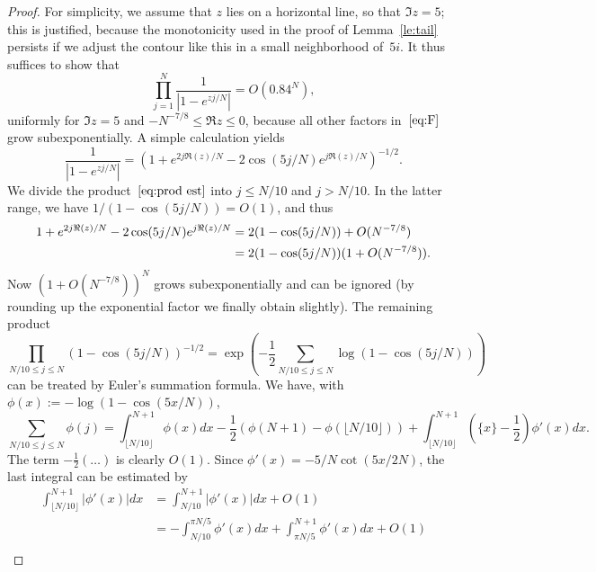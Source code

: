 \documentclass[a4paper]{amsart}
\begin{document}
\begin{proof}
For simplicity, we assume that $z$ lies on a horizontal line,
so that $\Im z=5$; this is justified, because the monotonicity
used in the proof of Lemma~\ref{le:tail} persists if we adjust the contour like
this in a small neighborhood of~$5i$.
  It thus suffices to show that
  \begin{equation}\label{eq:prod est}
      \prod_{j=1}^N \frac{1}{|1-e^{z j/N}|} = O(0.84^N),
   \end{equation}
  uniformly for $\Im z=5$ and $-N^{-7/8} \leq \Re z \leq 0$,
  because all other factors in~$\eqref{eq:F}$ grow subexponentially.
  A simple calculation yields
  \begin{equation}\label{eq:abs expl}
    \frac{1}{|1-e^{z j/N}|} = \left(1+  e^{2j \Re(z)/N} - 2\cos(5j/N)
    e^{j \Re(z)/N} \right)^{-1/2}.
  \end{equation}
  We divide the product~$\eqref{eq:prod est}$
  into $j\leq N/10$ and $j>N/10$. In the latter range,
  we have $1/(1-\cos(5j/N))=O(1)$, and thus
  \begin{align}
    1+  e^{2j \Re(z)/N} - 2\cos(5j/N) e^{j \Re(z)/N}
      &= 2(1-\cos(5j/N))+ O(N^{-7/8}) \notag \\
    &= 2(1-\cos(5j/N))(1+ O(N^{-7/8})). \label{eq:j big}
  \end{align}
  Now $(1+ O(N^{-7/8}))^N$ grows subexponentially and can be ignored (by rounding
  up the exponential factor we finally obtain slightly). The remaining product
  \begin{equation}\label{eq:prod sum}
    \prod_{N/10 \leq j\leq N}(1-\cos(5j/N))^{-1/2} =
    \exp\left(-\frac12 \sum_{N/10 \leq j\leq N} \log(1-\cos(5j/N)) \right)
  \end{equation}
  can be treated by Euler's summation formula.
  We have, with $\phi(x):=-\log(1-\cos(5x/N))$,
  \begin{equation}\label{eq:euler}
    \sum_{N/10 \leq j\leq N} \phi(j) = \int_{\lfloor N/10 \rfloor}^{N+1} \phi(x)dx
    -\frac12(\phi(N+1)-\phi(\lfloor N/10 \rfloor)) +
    \int_{\lfloor N/10 \rfloor}^{N+1}(\{x\}-\frac12)\phi'(x)dx.
  \end{equation}
  The term $-\tfrac12(\dots)$ is clearly $O(1)$.
  Since $\phi'(x) = -5/N \cot(5x/2N)$, the last integral can be estimated by
  \begin{align*}
    \int_{\lfloor N/10 \rfloor}^{N+1} | \phi'(x) | dx
    &= \int_{ N/10 }^{N+1} | \phi'(x) | dx  + O(1) \\
    &= -\int_{ N/10 }^{\pi N/5}\phi'(x) dx + \int_{\pi N/5}^{N+1}\phi'(x)dx +O(1) \\

\end{align*}
\end{proof}
\end{document}
